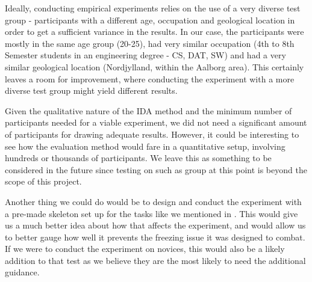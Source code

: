Ideally, conducting empirical experiments relies on the use of a very diverse test group - participants with a different age, occupation and geological location in order to get a sufficient variance in the results. In our case, the participants were mostly in the same age group (20-25), had very similar occupation (4th to 8th Semester students in an engineering degree - CS, DAT, SW) and had a very similar geological location (Nordjylland, within the Aalborg area). This certainly leaves a room for improvement, where conducting the experiment with a more diverse test group might yield different results.

Given the qualitative nature of the IDA method and the minimum number of participants needed for a viable experiment, we did not need a significant amount of participants for drawing adequate results. However, it could be interesting to see how the evaluation method would fare in a quantitative setup, involving hundreds or thousands of participants. We leave this as something to be considered in the future since testing on such as group at this point is beyond the scope of this project.

Another thing we could do would be to design and conduct the experiment with a pre-made skeleton set up for the tasks like we mentioned in .
This would give us a much better idea about how that affects the experiment, and would allow us to better gauge how well it prevents the freezing issue it was designed to combat.
If we were to conduct the experiment on novices, this would also be a likely addition to that test as we believe they are the most likely to need the additional guidance. 

